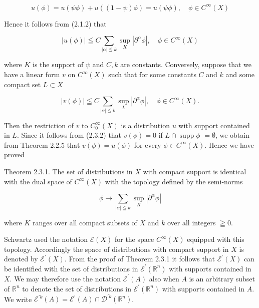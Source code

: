 \[
u(\phi)=u(\psi \phi)+u((1-\psi) \phi)=u(\psi \phi), \quad \phi \in C^{\infty}(X)
\]

Hence it follows from (2.1.2) that


\begin{equation*}
|u(\phi)| \leqq C \sum_{|\alpha| \leqq k} \sup _{K}\left|\partial^{\alpha} \phi\right|, \quad \phi \in C^{\infty}(X) \tag{2.3.1}
\end{equation*}


where $K$ is the support of $\psi$ and $C, k$ are constants. Conversely, suppose that we have a linear form $v$ on $C^{\infty}(X)$ such that for some constants $C$ and $k$ and some compact set $L \subset X$


\begin{equation*}
|v(\phi)| \leqq C \sum_{|\alpha| \leqq k} \sup _{L}\left|\partial^{\alpha} \phi\right|, \quad \phi \in C^{\infty}(X) . \tag{2.3.2}
\end{equation*}


Then the restriction of $v$ to $C_{0}^{\infty}(X)$ is a distribution $u$ with support contained in $L$. Since it follows from (2.3.2) that $v(\phi)=0$ if $L \cap \operatorname{supp} \phi$ $=\emptyset$, we obtain from Theorem 2.2.5 that $v(\phi)=u(\phi)$ for every $\phi \in C^{\infty}(X)$. Hence we have proved

Theorem 2.3.1. The set of distributions in $X$ with compact support is identical with the dual space of $C^{\infty}(X)$ with the topology defined by the semi-norms

\[
\phi \rightarrow \sum_{|\alpha| \leqq k} \sup _{K}\left|\partial^{\alpha} \phi\right|
\]

where $K$ ranges over all compact subsets of $X$ and $k$ over all integers $\geqq 0$.

Schwartz used the notation $\mathscr{E}(X)$ for the space $C^{\infty}(X)$ equipped with this topology. Accordingly the space of distributions with compact support in $X$ is denoted by $\mathscr{E}^{\prime}(X)$. From the proof of Theorem 2.3.1 it follows that $\mathscr{E}^{\prime}(X)$ can be identified with the set of distributions in $\mathscr{E}^{\prime}\left(\mathbb{R}^{n}\right)$ with supports contained in $X$. We may therefore use the notation $\mathscr{E}^{\prime}(A)$ also when $A$ is an arbitrary subset of $\mathbb{R}^{n}$ to denote the set of distributions in $\mathscr{E}^{\prime}\left(\mathbb{R}^{n}\right)$ with supports contained in $A$. We write $\mathscr{E}^{\prime k}(A)=\mathscr{E}^{\prime}(A) \cap \mathscr{D}^{\prime k}\left(\mathbb{R}^{n}\right)$.

